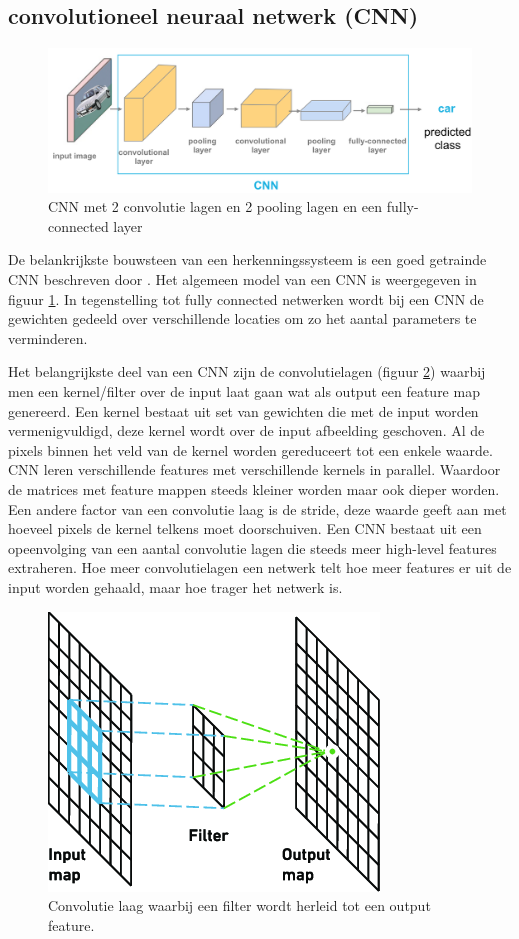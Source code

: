 
\subsection{convolutioneel neuraal netwerk (CNN) }
\begin{figure}[!ht]
    \centering
 	\includegraphics[width=0.80\linewidth]{fig/CNN.png}
 	\caption{CNN met 2 convolutie lagen en 2 pooling lagen en een fully-connected layer}
 	\label{fig:cnn}
\end{figure}

De belankrijkste bouwsteen van een herkenningssysteem is een goed getrainde CNN beschreven door \cite{jiang_deep_2019}.
Het algemeen model van een CNN is weergegeven in figuur \ref{fig:cnn}. 
In tegenstelling tot fully connected netwerken wordt bij een CNN de gewichten gedeeld over verschillende locaties om zo het aantal parameters te verminderen.
 
Het belangrijkste deel van een CNN zijn de convolutielagen (figuur \ref{fig:conv_laag}) waarbij men een kernel/filter over de input laat gaan wat als output een feature map genereerd. 
Een kernel bestaat uit set van gewichten die met de input worden vermenigvuldigd, deze kernel wordt over de input afbeelding geschoven. 
Al de pixels binnen het veld van de kernel worden gereduceert tot een enkele waarde. 
CNN leren verschillende features met verschillende kernels in parallel. 
Waardoor de matrices met feature mappen steeds kleiner worden maar ook dieper worden. Een andere factor van een convolutie laag is de stride, deze waarde geeft aan met hoeveel pixels de kernel telkens moet doorschuiven. 
Een CNN bestaat uit een opeenvolging van een aantal convolutie lagen die steeds meer high-level features extraheren. Hoe meer convolutielagen een netwerk telt hoe meer features er uit de input worden gehaald, maar hoe trager het netwerk is. 

\begin{figure}[!ht]
	\centering
	\includegraphics[width=0.35\linewidth]{fig/convolution layer.png}
	\caption{Convolutie laag waarbij een filter wordt herleid tot een output feature.}
	\label{fig:conv_laag}
\end{figure}

